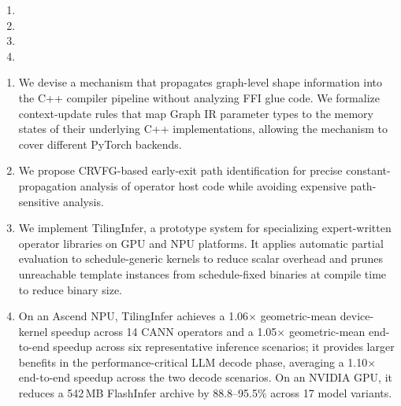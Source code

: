 \par
{\color{red}
\begin{enumerate}
    \item {}
    \item {}
    \item {}
    \item {}
\end{enumerate}
}

\par
{\color{blue}
\begin{enumerate}
    \item We devise a mechanism that propagates graph-level shape information into the C++ compiler pipeline without analyzing FFI glue code. We formalize context-update rules that map Graph IR parameter types to the memory states of their underlying C++ implementations, allowing the mechanism to cover different PyTorch backends.
    \item We propose CRVFG-based early-exit path identification for precise constant-propagation analysis of operator host code while avoiding expensive path-sensitive analysis.
    \item We implement TilingInfer, a prototype system for specializing expert-written operator libraries on GPU and NPU platforms. It applies automatic partial evaluation to schedule-generic kernels to reduce scalar overhead and prunes unreachable template instances from schedule-fixed binaries at compile time to reduce binary size.
    \item On an Ascend NPU, TilingInfer achieves a 1.06$\times$ geometric-mean device-kernel speedup across 14 CANN operators and a 1.05$\times$ geometric-mean end-to-end speedup across six representative inference scenarios; it provides larger benefits in the performance-critical LLM decode phase, averaging a 1.10$\times$ end-to-end speedup across the two decode scenarios. On an NVIDIA GPU, it reduces a 542\,MB FlashInfer archive by 88.8--95.5\% across 17 model variants.
\end{enumerate}
}
